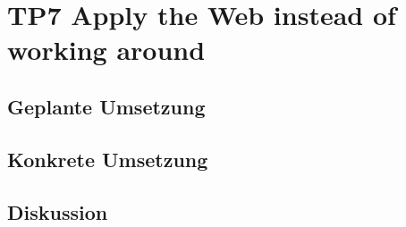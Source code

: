 \section{TP7 Apply the Web instead of working around}
\label{sec:principle-tp7-apply-the-web}

\subsection*{Geplante Umsetzung}


\subsection*{Konkrete Umsetzung}


\subsection*{Diskussion}

